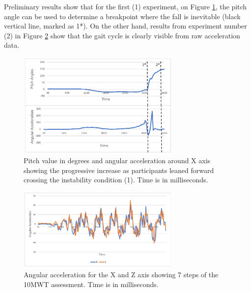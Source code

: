\documentclass[conference]{IEEEtran}
\begin{document}
Preliminary results show that for the first (1) experiment, on Figure \ref{fig:vestibular}, the pitch angle can be used to determine a breakpoint where the fall is inevitable (black vertical line, marked as 1*).   On the other hand, results from experiment number (2) in Figure \ref{fig:gait} show that the gait cycle is clearly visible from raw acceleration data.

\begin{figure}[h!]
\centering
\includegraphics[width=8cm]{vestibular.png}
\caption{Pitch value in degrees and angular acceleration around X axis showing the progressive increase as participants leaned forward crossing the instability condition (1).  Time is in milliseconds. }
\label{fig:vestibular}
\end{figure}


\begin{figure}[h!]
\centering
\includegraphics[width=8cm]{gait.png}
\caption{Angular acceleration for the X and Z axis showing 7 steps of the 10MWT assessment.  Time is in milliseconds. }
\label{fig:gait}
\end{figure}

%
%
%
\end{document}
